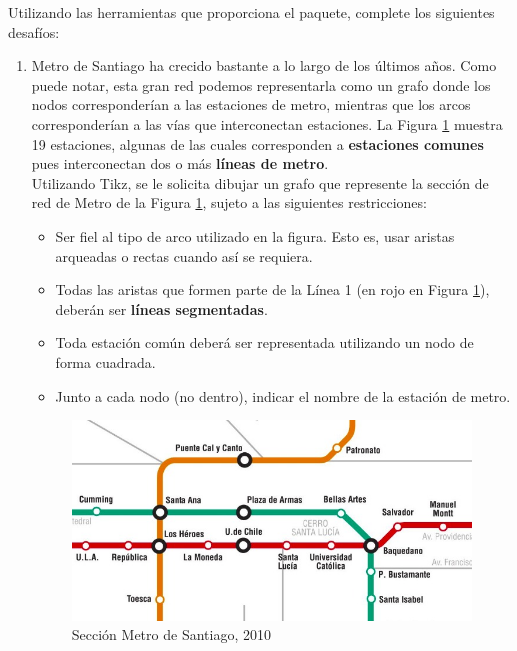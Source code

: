 \documentclass[letterpaper,10pt]{article}
\begin{document}
\vspace{0.4cm}

Utilizando las herramientas que proporciona el paquete, complete los siguientes desafíos:
\begin{enumerate}[1)]
\item Metro de Santiago ha crecido bastante a lo largo de los últimos años. Como puede notar, esta gran red podemos representarla como un grafo donde los nodos corresponderían a las estaciones de metro, mientras que los arcos corresponderían a las vías que interconectan estaciones. La Figura \ref{fig:metro} muestra 19 estaciones, algunas de las cuales corresponden a \textbf{estaciones comunes} pues interconectan dos o más \textbf{líneas de metro}. \\
Utilizando Tikz, se le solicita dibujar un grafo que represente la sección de red de Metro de la Figura \ref{fig:metro}, sujeto a las siguientes restricciones: 
\begin{itemize}
    \item Ser fiel al tipo de arco utilizado en la figura. Esto es, usar aristas arqueadas o rectas cuando así se requiera.
    \item Todas las aristas que formen parte de la Línea 1 (en rojo en Figura \ref{fig:metro}), deberán ser \textbf{líneas segmentadas}.
    \item Toda estación común deberá ser representada utilizando un nodo de forma cuadrada. 
    \item Junto a cada nodo (no dentro), indicar el nombre de la estación de metro.
\end{itemize} 

\begin{minipage}{\linewidth}
      \centering
      \begin{minipage}{0.8\linewidth}
          \begin{figure}[H]
              \includegraphics[width=0.9\linewidth]{sec_metro.jpeg}
              \caption{Sección Metro de Santiago, 2010}
              \label{fig:metro}
          \end{figure}
      \end{minipage}
  \end{minipage}
  

\end{enumerate}
\end{document}
